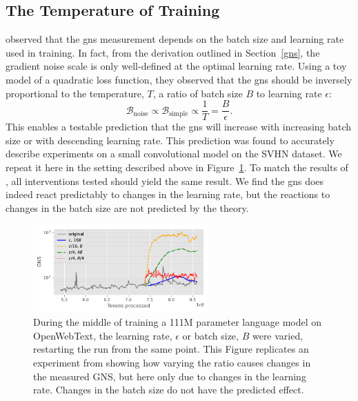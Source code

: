 \documentclass{article}
\newcommand{\Bnoise}{\mathcal{B}_{\textrm{noise}}}
\newcommand{\Bsimple}{\mathcal{B}_{\textrm{simple}}}
\begin{document}
\subsection{The Temperature of Training}\label{temperature}


\citet[App. C]{mccandlish2018empirical} observed that the \ac{gns} measurement
depends on the batch size and learning rate used in training. In fact, from the
derivation outlined in Section~\ref{gns}, the gradient noise scale is only
well-defined at the optimal learning rate. Using a toy model of a quadratic
loss function, they observed that the \ac{gns} should be inversely proportional
to the temperature, $T$, a ratio of batch size $B$ to learning rate $\epsilon$:
\[
    \Bnoise \propto \Bsimple \propto \frac{1}{T} = \frac{B}{\epsilon}.
\]
This enables a testable prediction that the \ac{gns} will increase with increasing
batch size or with descending learning rate. This prediction was found to accurately
describe experiments on a small convolutional model on the SVHN dataset. We repeat it here
in the setting described above in Figure~\ref{fig:temp}. To match the results of
\citet{mccandlish2018empirical}, all interventions tested should yield the same
result. We find the \ac{gns} does indeed react predictably to changes in
the learning rate, but the reactions to changes in the batch size are not
predicted by the theory.


\begin{figure}
    \centering
    \includegraphics[width=0.6\textwidth]{figures/temp.pdf}
    \caption{
        During the middle of training a 111M parameter language model on
        OpenWebText, the learning rate, $\epsilon$ or batch size, $B$ were
        varied, restarting the run from the same point. This Figure replicates
        an experiment from \citet{mccandlish2018empirical} showing how varying the ratio
        causes changes in the measured GNS, but here only due to changes in the
        learning rate. Changes in the batch size do not have the predicted effect.}
    \label{fig:temp}
\end{figure}
\end{document}
